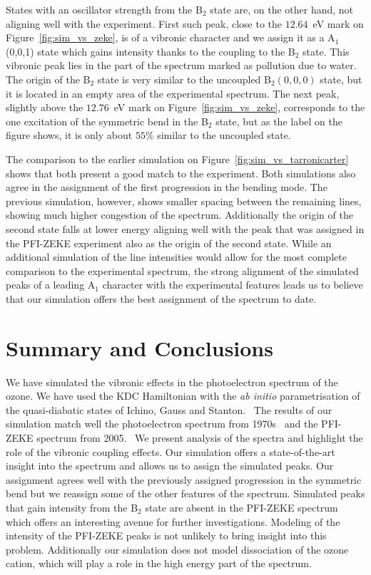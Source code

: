 \documentclass[12pt,a4paper,prb,aps,superscriptaddress]{revtex4}
\begin{document}
States with an oscillator strength from the B$_2$ state are, on the other
hand, not aligning well with the experiment. First such peak, close to the
$12.64$~eV mark on Figure~\ref{fig:sim_vs_zeke}, is of a vibronic
character and we assign it as a A$_1$(0,0,1) state which gains intensity
thanks to the coupling to the B$_2$ state. This vibronic peak lies in the part
of the spectrum marked as pollution due to water. The origin of the B$_2$
state is very similar to the uncoupled B$_2(0,0,0)$ state, but it is located
in an empty area of the experimental spectrum. The next peak, slightly above
the $12.76$~eV mark on Figure~\ref{fig:sim_vs_zeke}, corresponds to the one
excitation of the symmetric bend in the B$_2$ state, but as the label on the
figure shows, it is only about $55$\% similar to the uncoupled state.

The comparison to the earlier simulation on
Figure~\ref{fig:sim_vs_tarronicarter} shows that both present a good match to
the experiment. Both simulations also agree in the assignment of the first
progression in the bending mode. The previous simulation, however, shows
smaller spacing between the remaining lines, showing much higher congestion of
the spectrum. Additionally the origin of the second state falls at lower
energy aligning well with the peak that was assigned in the PFI-ZEKE
experiment also as the origin of the second state. While an additional
simulation of the line intensities would allow for the most complete
comparison to the experimental spectrum, the strong alignment of the simulated
peaks of a leading A$_1$ character with the experimental features leads us to
believe that our simulation offers the best assignment of the spectrum to
date.

\section{Summary and Conclusions} 

We have simulated the vibronic effects in the photoelectron spectrum of the
ozone.  We have used the KDC Hamiltonian\cite{Cederbaum:LVC:84, KDC:81,
Koppel:CIbookCh7:04} with the \emph{ab initio} parametrisation of the
quasi-diabatic states of Ichino, Gauss and Stanton.~\cite{Stanton:EOMIPdeg:09}
The results of our simulation match well the photoelectron spectrum from
1970s~\cite{dyke:O3:74} and the PFI-ZEKE spectrum from
2005.~\cite{Willitsch:O3ZEKE:2005} We present analysis of the spectra and
highlight the role of the vibronic coupling effects. Our simulation offers a
state-of-the-art insight into the spectrum and allows us to assign the
simulated peaks. Our assignment agrees well with the previously assigned
progression in the symmetric bend but we reassign some of the other features
of the spectrum. Simulated peaks that gain intensity from the B$_2$ state are
absent in the PFI-ZEKE spectrum which offers an interesting avenue for further
investigations. Modeling of the intensity of the PFI-ZEKE peaks is not
unlikely to bring insight into this problem.  Additionally our simulation does
not model dissociation of the ozone cation, which will play a role in the high
energy part of the spectrum.
\end{document}
